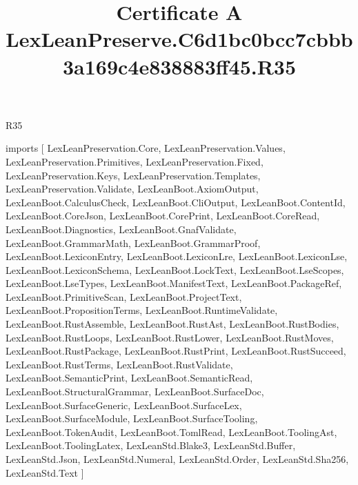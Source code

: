 \begin{lexlean}{R35}
\title{Certificate A LexLeanPreserve.C6d1bc0bcc7cbbb3a169c4e838883ff45.R35}
\begin{coremodule}
imports [
  LexLeanPreservation.Core,
  LexLeanPreservation.Values,
  LexLeanPreservation.Primitives,
  LexLeanPreservation.Fixed,
  LexLeanPreservation.Keys,
  LexLeanPreservation.Templates,
  LexLeanPreservation.Validate,
  LexLeanBoot.AxiomOutput,
  LexLeanBoot.CalculusCheck,
  LexLeanBoot.CliOutput,
  LexLeanBoot.ContentId,
  LexLeanBoot.CoreJson,
  LexLeanBoot.CorePrint,
  LexLeanBoot.CoreRead,
  LexLeanBoot.Diagnostics,
  LexLeanBoot.GnafValidate,
  LexLeanBoot.GrammarMath,
  LexLeanBoot.GrammarProof,
  LexLeanBoot.LexiconEntry,
  LexLeanBoot.LexiconLre,
  LexLeanBoot.LexiconLse,
  LexLeanBoot.LexiconSchema,
  LexLeanBoot.LockText,
  LexLeanBoot.LseScopes,
  LexLeanBoot.LseTypes,
  LexLeanBoot.ManifestText,
  LexLeanBoot.PackageRef,
  LexLeanBoot.PrimitiveScan,
  LexLeanBoot.ProjectText,
  LexLeanBoot.PropositionTerms,
  LexLeanBoot.RuntimeValidate,
  LexLeanBoot.RustAssemble,
  LexLeanBoot.RustAst,
  LexLeanBoot.RustBodies,
  LexLeanBoot.RustLoops,
  LexLeanBoot.RustLower,
  LexLeanBoot.RustMoves,
  LexLeanBoot.RustPackage,
  LexLeanBoot.RustPrint,
  LexLeanBoot.RustSucceed,
  LexLeanBoot.RustTerms,
  LexLeanBoot.RustValidate,
  LexLeanBoot.SemanticPrint,
  LexLeanBoot.SemanticRead,
  LexLeanBoot.StructuralGrammar,
  LexLeanBoot.SurfaceDoc,
  LexLeanBoot.SurfaceGeneric,
  LexLeanBoot.SurfaceLex,
  LexLeanBoot.SurfaceModule,
  LexLeanBoot.SurfaceTooling,
  LexLeanBoot.TokenAudit,
  LexLeanBoot.TomlRead,
  LexLeanBoot.ToolingAst,
  LexLeanBoot.ToolingLatex,
  LexLeanStd.Blake3,
  LexLeanStd.Buffer,
  LexLeanStd.Json,
  LexLeanStd.Numeral,
  LexLeanStd.Order,
  LexLeanStd.Sha256,
  LexLeanStd.Text
]


\end{coremodule}
\end{lexlean}
